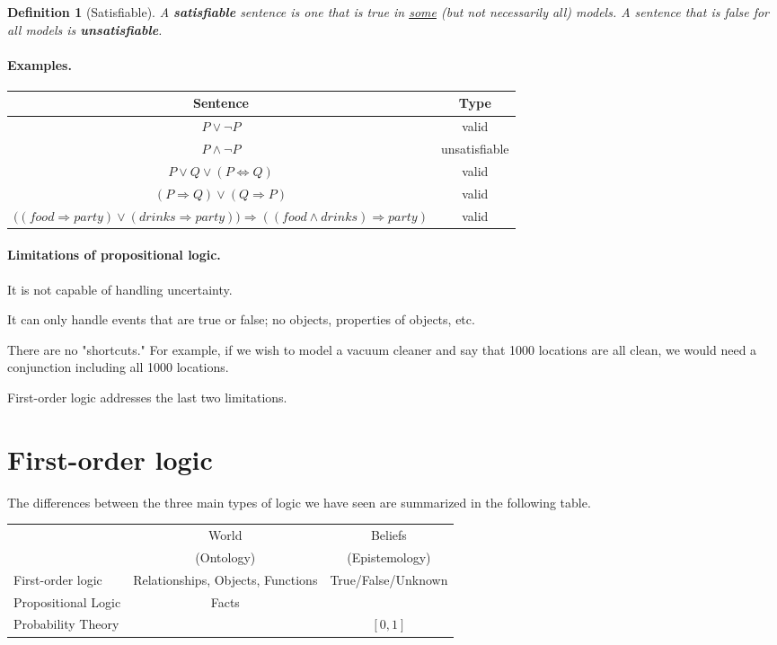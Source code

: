 \documentclass[10pt,a4paper]{article}
\newtheorem{defin}{Definition}
\newenvironment{itemize_packed}{
\begin{itemize}
\setlength{\itemsep}{0pt}
\setlength{\parskip}{0pt}
}{\end{itemize}}
\begin{document}
\begin{defin}[Satisfiable]
A \emph{\textbf{satisfiable}} sentence is one that is true in \underline{some} (but not necessarily all) models. A sentence that is false for all models is \emph{\textbf{unsatisfiable}}.
\end{defin}

\paragraph{Examples.}
\begin{center}
\begin{tabular}{c c}
\textbf{Sentence} & \textbf{Type} \\
\hline
$P\lor\neg P$ & valid \\
$P\land\neg P$ & unsatisfiable \\
$P\lor Q\lor (P\iff Q)$ & valid \\
$(P\Rightarrow Q) \lor (Q\Rightarrow P)$ & valid \\
$\big((food\Rightarrow party)\lor (drinks\Rightarrow party)\big) \Rightarrow ((food\land drinks)\Rightarrow party)$ & valid
\end{tabular}
\end{center}

\paragraph{Limitations of propositional logic.}
\begin{itemize_packed}
\item It is not capable of handling uncertainty.
\item It can only handle events that are true or false; no objects, properties of objects, etc.
\item There are no "shortcuts." For example, if we wish to model a vacuum cleaner and say that 1000 locations are all clean, we would need a conjunction including all 1000 locations.
\end{itemize_packed}
First-order logic addresses the last two limitations.

\section{First-order logic}

The differences between the three main types of logic we have seen are summarized in the following table.
\begin{center}
\begin{tabular}{l | c | c |}
\cline{2-3}
& World & Beliefs \\
& (Ontology) & (Epistemology) \\
\hline
\multicolumn{1}{|l|}{First-order logic} & Relationships, Objects, Functions & \multirow{2}{*}{True/False/Unknown} \\
\cline{1-2}
\multicolumn{1}{|l|}{Propositional Logic} & \multirow{2}{*}{Facts} & \\
\cline{1-1} \cline{3-3}
\multicolumn{1}{|l|}{Probability Theory} & & $[0,1]$ \\
\hline
\end{tabular}
\end{center}
\end{document}
